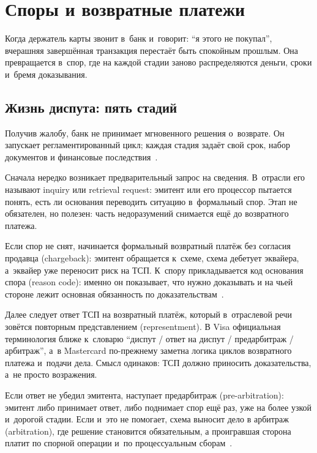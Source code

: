 
\chapter{Споры и возвратные платежи}\label{ch:disputes}

Когда держатель карты звонит в~банк и~говорит: \enquote{я этого не покупал},
вчерашняя завершённая транзакция перестаёт быть спокойным прошлым. Она
превращается в~спор, где на каждой стадии заново распределяются деньги,
сроки и~бремя доказывания.

\section{Жизнь диспута: пять стадий}\label{sec:disputes-lifecycle}

Получив жалобу, банк не принимает мгновенного решения о~возврате.
Он запускает регламентированный цикл; каждая стадия задаёт свой
срок, набор документов и финансовые последствия~\cite{visa-core-rules,mc-chargeback-guide}.

Сначала нередко возникает предварительный запрос на сведения. В~отрасли
его называют inquiry или retrieval request: эмитент или его процессор
пытается понять, есть ли основания переводить ситуацию в~формальный
спор. Этап не обязателен, но полезен: часть недоразумений снимается ещё
до возвратного платежа.

Если спор не снят, начинается формальный возвратный платёж без согласия продавца (chargeback):
эмитент обращается к~схеме, схема дебетует эквайера, а~эквайер уже
переносит риск на ТСП. К~спору прикладывается код основания
спора (reason code): именно он показывает, что нужно доказывать и на
чьей стороне лежит основная обязанность по доказательствам~\cite{visa-core-rules}.

Далее следует ответ ТСП на возвратный платёж, который в~отраслевой речи
зовётся повторным представлением (representment). В Visa
официальная терминология ближе к~словарю \enquote{диспут / ответ на
диспут / предарбитраж / арбитраж}, а~в Mastercard
по-прежнему заметна логика циклов возвратного платежа и~подачи дела. Смысл
одинаков: ТСП должно приносить доказательства, а~не
просто возражения.

Если ответ не убедил эмитента, наступает предарбитраж (pre-arbitration):
эмитент либо принимает ответ, либо поднимает спор ещё раз, уже на более
узкой и~дорогой стадии. Если и~это не помогает, схема выносит дело в
арбитраж (arbitration), где решение становится обязательным, а
проигравшая сторона платит по спорной операции и~по процессуальным
сборам~\cite{visa-core-rules,mc-chargeback-guide}.

